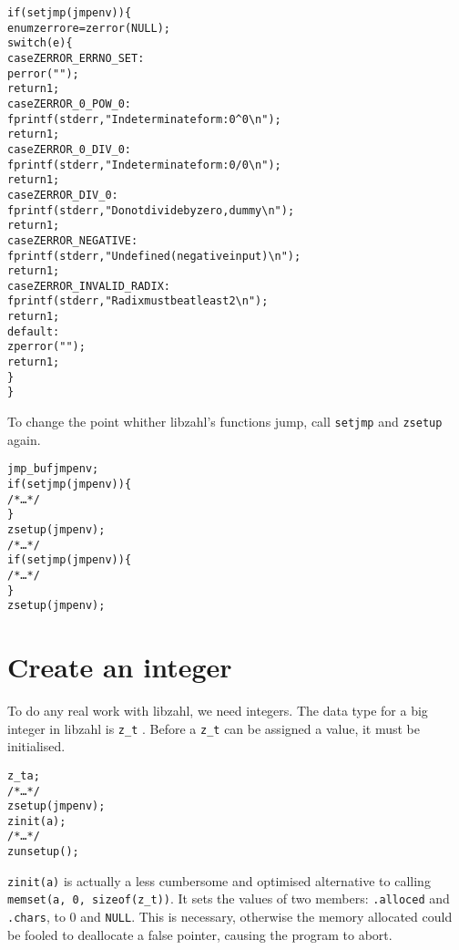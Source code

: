\begin{alltt}
   \textcolor{c}{if (setjmp(jmpenv)) \{}
       enum zerror e = zerror(NULL);
       switch (e) \{
       case ZERROR_ERRNO_SET:
           perror("");
           \textcolor{c}{return 1;}
       case ZERROR_0_POW_0:
           fprintf(stderr, "Indeterminate form: 0^0\verb|\|n");
           \textcolor{c}{return 1;}
       case ZERROR_0_DIV_0:
           fprintf(stderr, "Indeterminate form: 0/0\verb|\|n");
           \textcolor{c}{return 1;}
       case ZERROR_DIV_0:
           fprintf(stderr, "Do not divide by zero, dummy\verb|\|n");
           \textcolor{c}{return 1;}
       case ZERROR_NEGATIVE:
           fprintf(stderr, "Undefined (negative input)\verb|\|n");
           \textcolor{c}{return 1;}
       case ZERROR_INVALID_RADIX:
           fprintf(stderr, "Radix must be at least 2\verb|\|n");
           \textcolor{c}{return 1;}
       default:
           zperror("");
           \textcolor{c}{return 1;}
       \}
   \textcolor{c}{\}}
\end{alltt}

To change the point whither libzahl's functions
jump, call {\tt setjmp} and {\tt zsetup} again.

\begin{alltt}
   jmp_buf jmpenv;
   if (setjmp(jmpenv)) \{
       \textcolor{c}{/* \textrm{\ldots} */}
   \}
   zsetup(jmpenv);
   \textcolor{c}{/* \textrm{\ldots} */}
   if (setjmp(jmpenv)) \{
       \textcolor{c}{/* \textrm{\ldots} */}
   \}
   zsetup(jmpenv);
\end{alltt}


\newpage
\section{Create an integer}
\label{sec:Create an integer}

To do any real work with libzahl, we need integers. The
data type for a big integer in libzahl is {\tt z\_t}
. Before a {\tt z\_t}
can be assigned a value, it must be initialised.

\begin{alltt}
   z_t a;
   \textcolor{c}{/* \textrm{\ldots} */
   zsetup(jmpenv);}
   zinit(a);
   \textcolor{c}{/* \textrm{\ldots} */
   zunsetup();}
\end{alltt}

\noindent
{\tt zinit(a)} is actually a less cumbersome and optimised
alternative to calling {\tt memset(a, 0, sizeof(z\_t))}.
It sets the values of two members: {\tt .alloced} and
{\tt .chars}, to 0 and {\tt NULL}. This is necessary,
otherwise the memory allocated could be fooled to deallocate
a false pointer, causing the program to abort.

